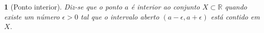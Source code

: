 \documentclass{article}
\newtheorem{mydef}{}
\theoremstyle{remark}
\newtheorem*{remark}{Nota}
\theoremstyle{plain}
\theoremstyle{plain}
\theoremstyle{plain}
\begin{document}
\begin{mydef}[Ponto interior]
        Diz-se que o ponto $a$ é interior ao conjunto $X \subset \mathbb{R}$ quando existe um número 
        $\epsilon > 0$ tal que o intervalo aberto $(a-\epsilon, a+\epsilon)$ está contido em $X$.
    \end{mydef}
\end{document}
